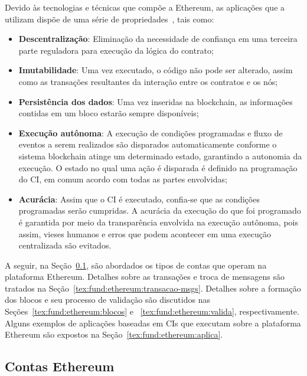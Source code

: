 Devido às tecnologias e técnicas que compõe a Ethereum, as aplicações que a utilizam dispõe de uma série de propriedades~\cite{ethereum2014whitepaper, survey-Hewa2021smart-contract}, tais como:
\begin{itemize}
    \item \textbf{Descentralização}: Eliminação da necessidade de confiança em uma terceira parte reguladora para execução da lógica do contrato;
    \item \textbf{Imutabilidade}: Uma vez executado, o código não pode ser alterado, assim como as transações resultantes da interação entre os contratos e os nós;
    \item \textbf{Persistência dos dados}: Uma vez inseridas na blockchain, as informações contidas em um bloco estarão sempre disponíveis;
    \item \textbf{Execução autônoma}: A execução de condições programadas e fluxo de eventos a serem realizados são disparados automaticamente conforme o sistema blockchain atinge um determinado estado, garantindo a autonomia da execução. O estado no qual uma ação é disparada é definido na programação do CI, em comum acordo com todas as partes envolvidas;
    \item \textbf{Acurácia}: Assim que o CI é executado, confia-se que as condições programadas serão cumpridas. A acurácia da execução do que foi programado é garantida por meio da transparência envolvida na execução autônoma, pois assim, vieses humanos e erros que podem acontecer em uma execução centralizada são evitados.
\end{itemize}

A seguir, na Seção~\ref{tex:fund:ethereum:clientes}, são abordados os tipos de contas que operam na plataforma Ethereum. Detalhes sobre as transações e troca de mensagens  são tratados na Seção~\ref{tex:fund:ethereum:transacao-msgs}. Detalhes sobre a formação dos blocos e seu processo de validação são discutidos nas Seções~\ref{tex:fund:ethereum:blocos} e ~\ref{tex:fund:ethereum:valida}, respectivamente. Alguns exemplos de aplicações baseadas em CIs que executam sobre a plataforma Ethereum são expostos na Seção~\ref{tex:fund:ethereum:aplica}. 

\subsection{Contas Ethereum} \label{tex:fund:ethereum:clientes}

